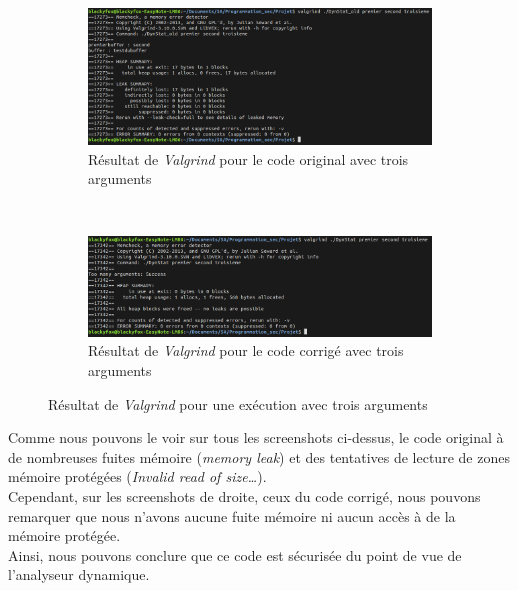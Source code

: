 \begin{figure}[H]
  \begin{subfigure}[b]{0.45\textwidth}
    \includegraphics[width=\textwidth]{img/conc9.png}
    \caption{Résultat de \textit{Valgrind} pour le code original avec trois arguments}
  \end{subfigure}
  ~
  \begin{subfigure}[b]{0.45\textwidth}
    \includegraphics[width=\textwidth]{img/conc10.png}
    \caption{Résultat de \textit{Valgrind} pour le code corrigé avec trois arguments}
  \end{subfigure}
  \caption{Résultat de \textit{Valgrind} pour une exécution avec trois arguments}
\end{figure}
Comme nous pouvons le voir sur tous les screenshots ci-dessus, le code original à de nombreuses fuites mémoire (\textit{memory leak}) et des tentatives de lecture de zones mémoire protégées (\textit{Invalid read of size\ldots}).\\
Cependant, sur les screenshots de droite, ceux du code corrigé, nous pouvons remarquer que nous n'avons aucune fuite mémoire ni aucun accès à de la mémoire protégée.\\
Ainsi, nous pouvons conclure que ce code est sécurisée du point de vue de l'analyseur dynamique.